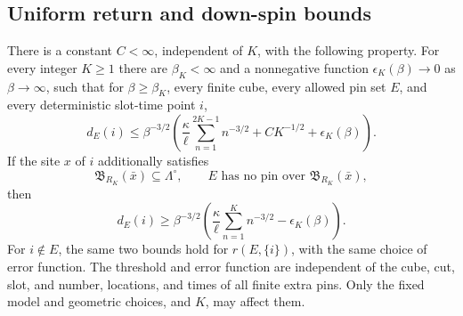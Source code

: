 \subsection{Uniform return and down-spin bounds}

\begin{theorem}
\label{thm:return-bounds}
There is a constant \(C<\infty\), independent of \(K\), with the
following property. For every integer \(K\ge1\) there are
\(\beta_K<\infty\) and a nonnegative function
\(\epsilon_K(\beta)\to0\) as \(\beta\to\infty\), such that for
\(\beta\ge\beta_K\), every finite cube, every allowed pin set
\(E\), and every deterministic slot-time point \(i\),
\begin{equation}\label{eq:down-upper}
 d_E(i)\le\beta^{-3/2}
 \left(\frac\kappa\ell\sum_{n=1}^{2K-1}n^{-3/2}
                  +CK^{-1/2}+\epsilon_K(\beta)\right).
\end{equation}
If the site \(x\) of \(i\) additionally satisfies
\begin{equation}\label{eq:pin-free-ball}
 \mathfrak B_{R_K}(\bar x)\subseteq\Lambda^\circ,
 \qquad E\text{ has no pin over }\mathfrak B_{R_K}(\bar x),
\end{equation}
then
\begin{equation}\label{eq:down-lower}
 d_E(i)\ge\beta^{-3/2}
 \left(\frac\kappa\ell\sum_{n=1}^{K}n^{-3/2}
                                      -\epsilon_K(\beta)\right).
\end{equation}
For \(i\notin E\), the same two bounds hold for \(r(E,\{i\})\),
with the same choice of error function. The threshold and error
function are independent of the cube, cut, slot, and number, locations,
and times of all finite extra pins. Only the fixed model and geometric
choices, and \(K\), may affect them.
\end{theorem}

